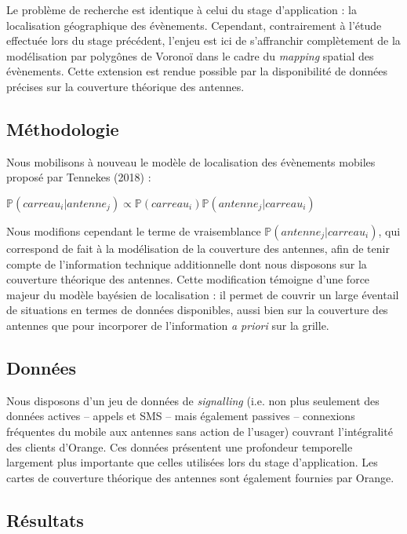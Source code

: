 \documentclass[12pt]{article}
\begin{document}
Le problème de recherche est identique à celui du stage d'application : la localisation géographique des évènements. Cependant, contrairement à l'étude effectuée lors du stage précédent, l'enjeu est ici de s'affranchir complètement de la modélisation par polygônes de Voronoï dans le cadre du \textit{mapping} spatial des évènements. Cette extension est rendue possible par la disponibilité de données précises sur la couverture théorique des antennes.

\subsection{Méthodologie}

Nous mobilisons à nouveau le modèle de localisation des évènements mobiles proposé par Tennekes (2018) : \begin{center}

\begingroup
\large
$\mathbb{P}(carreau_i | antenne_j) \propto \mathbb{P}(carreau_i) \mathbb{P}(antenne_j | carreau_i)$
\endgroup
\end{center}

Nous modifions cependant le terme de vraisemblance $\mathbb{P}(antenne_j | carreau_i)$, qui correspond de fait à la modélisation de la couverture des antennes, afin de tenir compte de l'information technique additionnelle dont nous disposons sur la couverture théorique des antennes. Cette modification témoigne d'une force majeur du modèle bayésien de localisation : il permet de couvrir un large éventail de situations en termes de données disponibles, aussi bien sur la couverture des antennes que pour incorporer de l'information \textit{a priori} sur la grille.

\subsection{Données}

Nous disposons d'un jeu de données de \textit{signalling} (i.e. non plus seulement des données actives -- appels et SMS -- mais également passives -- connexions fréquentes du mobile aux antennes sans action de l'usager) couvrant l'intégralité des clients d'Orange. Ces données présentent une profondeur temporelle largement plus importante que celles utilisées lors du stage d'application. Les cartes de couverture théorique des antennes sont également fournies par Orange.

\subsection{Résultats}
\end{document}
